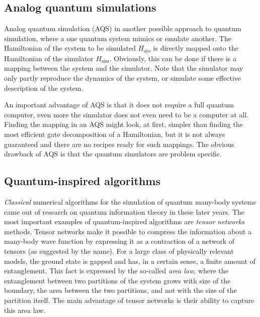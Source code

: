 \subsection{Analog quantum simulations}
\label{sub:analog_quantum_simulations}

Analog quantum simulation (AQS) in another possible approach to quantum simulation, where a one quantum system mimics or emulate another.
The Hamiltonian of the system to be simulated $H_{\text{sys}}$ is directly mapped onto the Hamiltonian of the simulator $H_{\text{sim}}$.
Obviously, this can be done if there is a mapping between the system and the simulator.
Note that the simulator may only partly reproduce the dynamics of the system, or simulate some effective description of the system.

An important advantage of AQS is that it does not require a full quantum computer, even more the simulator does not even need to be a computer at all.
Finding the mapping in an AQS might look, at first, simpler than finding the most efficient gate decomposition of a Hamiltonian, but it is not always guaranteed and there are no recipes ready for such mappings.
The obvious drawback of AQS is that the quantum simulators are problem specific.



\subsection{Quantum-inspired algorithms}
\label{sub:quantum_inspired_algorithms}

\emph{Classical} numerical algorithms for the simulation of quantum many-body systems came out of research on quantum information theory in these later years.
The most important examples of quantum-inspired algorithms are \emph{tensor networks} methods.
Tensor networks make it possible to compress the information about a many-body wave function by expressing it as a contraction of a network of tensors (as suggested by the name).
For a large class of physically relevant models, the ground state is gapped and has, in a certain sense, a finite amount of entanglement.
This fact is expressed by the so-called \emph{area law}, where the entanglement between two partitions of the system grows with size of the boundary, the area between the two partitions, and not with the size of the partition itself.
The main advantage of tensor networks is their ability to capture this area law.

